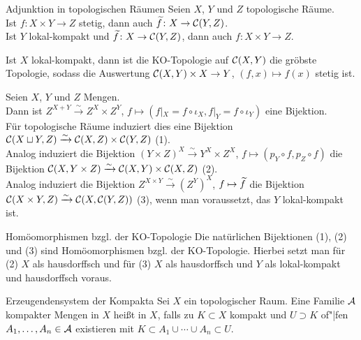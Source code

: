 \begin{Satz}{Adjunktion in topologischen Räumen}
    Seien $X$, $Y$ und $Z$ topologische Räume. \\
    Ist $f\colon X \times Y \rightarrow Z$ stetig, dann auch
    $\widetilde{f}\colon X \rightarrow \mathcal{C}(Y, Z)$. \\
    Ist $Y$ lokal-kompakt und $\widetilde{f}\colon X \rightarrow \mathcal{C}(Y, Z)$,
    dann auch $f\colon X \times Y \rightarrow Z$.
\end{Satz}

\begin{Kor}
    Ist $X$ lokal-kompakt, dann ist die KO-Topologie auf $\mathcal{C}(X, Y)$ die
    gröbste Topologie, sodass die Auswertung $\mathcal{C}(X, Y) \times X \rightarrow Y$,
    $(f, x) \mapsto f(x)$ stetig ist.
\end{Kor}

\linie

\begin{Bem}
    Seien $X$, $Y$ und $Z$ Mengen. \\
    Dann ist $Z^{X + Y} \xrightarrow{\sim} Z^X \times Z^Y$,
    $f \mapsto (f|_X = f \circ \iota_X, f|_Y = f \circ \iota_Y)$
    eine Bijektion. \\
    Für topologische Räume induziert dies eine Bijektion
    $\mathcal{C}(X \sqcup Y, Z) \xrightarrow{\sim} \mathcal{C}(X, Z) \times \mathcal{C}(Y, Z)$ (1). \\
    Analog induziert die Bijektion
    $(Y \times Z)^X \xrightarrow{\sim} Y^X \times Z^X$,
    $f \mapsto (p_Y \circ f, p_Z \circ f)$ die Bijektion
    $\mathcal{C}(X, Y \times Z) \xrightarrow{\sim} \mathcal{C}(X, Y) \times \mathcal{C}(X, Z)$ (2). \\
    Analog induziert die Bijektion
    $Z^{X \times Y} \xrightarrow{\sim} (Z^Y)^X$,
    $f \mapsto \widetilde{f}$ die Bijektion \\
    $\mathcal{C}(X \times Y, Z) \xrightarrow{\sim} \mathcal{C}(X, \mathcal{C}(Y, Z))$ (3), wenn
    man voraussetzt, das $Y$ lokal-kompakt ist.
\end{Bem}

\begin{Satz}{Homöomorphismen bzgl. der KO-Topologie}
    Die natürlichen Bijektionen (1), (2) und (3) sind Homöomorphismen
    bzgl. der KO-Topologie.
    Hierbei setzt man für (2) $X$ als hausdorffsch und
    für (3) $X$ als hausdorffsch und $Y$ als lokal-kompakt und hausdorffsch
    voraus.
\end{Satz}

\linie

\begin{Def}{Erzeugendensystem der Kompakta}
    Sei $X$ ein topologischer Raum.
    Eine Familie $\mathcal{A}$ kompakter Mengen in $X$ heißt
     in $X$, falls
    zu $K \subset X$ kompakt und $U \supset K$ of"|fen
    $A_1, \dotsc, A_n \in \mathcal{A}$ existieren mit
    $K \subset A_1 \cup \dotsb \cup A_n \subset U$.
\end{Def}

